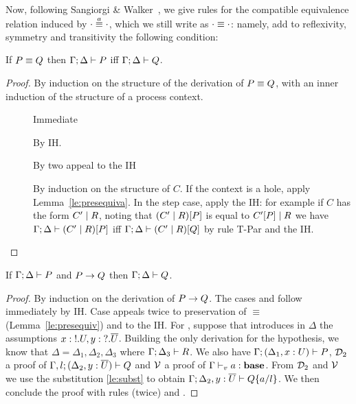 Now, following Sangiorgi \& Walker~\cite{picalcbook}, we give rules for the compatible
equivalence relation induced by $\sconga\cdot\cdot$, which we still
write as $\scong\cdot\cdot$: namely, add to reflexivity, symmetry and
transitivity the following condition:
 \begin{mathpar}
 \end{mathpar}

\begin{lemma}
  \label{le:presequiv}
    If \( \scong{P}{Q} \) then \( \types{\Gamma;\Delta}{P} \)  iff \( \types{\Gamma;\Delta}{Q} \).
\end{lemma}
\begin{proof}
  By induction on the structure of the derivation of \( \scong{P}{Q} \), with an inner induction of the structure of a process context.
  \begin{description}
  \item[] Immediate
      \item[] By IH.
      \item[]  By two appeal to the IH
      \item[] By induction on the structure of $C$. If
        the context is a hole, apply Lemma~\ref{le:presequiva}. In the
        step case, apply the IH: for example if $C$ has the form
        ${\Ppar {C'} R}$, noting that ${\PBpar{ C'} R}[P]$ is equal to
        ${\Ppar {C'[P]} R}$ we have
        \( \types{\Gamma;\Delta}{{\PBpar {C'} R}[P]} \) iff
        \( \types{\Gamma;\Delta}{{\PBpar {C'} R}[Q]} \) by rule T-Par and
        the IH.
  \end{description}
\end{proof}

\begin{theorem}
  If \( \types{\Gamma;\Delta}{P} \) and \( \reduces{P}{Q} \) then \( \types{\Gamma;\Delta}{Q} \).
\end{theorem}
\begin{proof}
  By induction on the derivation of $\reduces{P}{Q}$. The cases  and  follow immediately by IH. Case  appeals twice to
  preservation of $\equiv$ (Lemma~\ref{le:presequiv}) and to the
  IH. For , suppose that  introduces in $\Delta$ the
  assumptions $\Cadd{\hastype{x}{\Tout{U}}}{\hastype{y}{\Tin{\dual{U}}}}$.  Building the only derivation for the
  hypothesis, we know that $\Delta = \Delta_1, \Delta_2, \Delta_3$
  where $\types{\Gamma;\Delta_3}{R}$. We also have
  $\types{\Gamma;(\Cadd{\Delta_1}{\hastype{x}{U}})}{P}$, ${\cal D}_{2} $ a proof of
  $\types{\Gamma,l;(\Cadd{\Delta_2}{\hastype{y}{\dual{U}}})}{Q}$ and $\cal V $ a proof of
  $\typev{\Gamma}{\hastype{a}{\Tbase}}$.  From ${\cal D}_{2}$ and $\cal V$ we use the
  substitution \cref{le:subst} to obtain $\types{\Gamma;\Cadd{\Delta_2}{\hastype{y}{\dual{U}}}}{\subst{Q}{a}{l}}$. We then conclude the proof with rules  (twice) and .
\end{proof}

